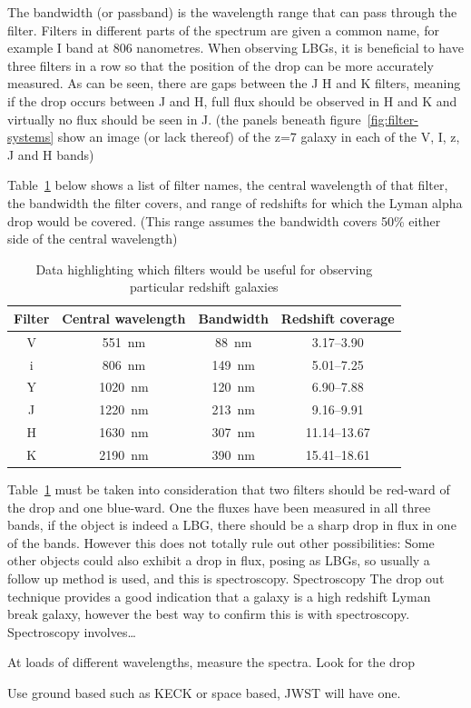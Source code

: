 		The bandwidth (or passband) is the wavelength range that can pass through the filter. Filters in different parts of the spectrum are given a common name, for example I band at 806 nanometres. When observing LBGs, it is beneficial to have three filters in a row so that the position of the drop can be more accurately measured. As can be seen, there are gaps between the J H and K filters, meaning if the drop occurs between J and H, full flux should be observed in H and K and virtually no flux should be seen in J. (the panels beneath figure~\ref{fig:filter-systems} show an image (or lack thereof) of the z=7 galaxy in each of the V, I, z, J and H bands)

		Table~\ref{tab:filter_characteristics} below shows a list of filter names, the central wavelength of that filter, the bandwidth the filter covers, and range of redshifts for which the Lyman alpha drop would be covered. (This  range assumes the bandwidth covers 50\% either side of the central wavelength)
		\begin{table}[ht]
			\begin{center}
				\begin{tabular}{c|c|c|c}
					Filter 	& Central wavelength & Bandwidth & Redshift coverage \\
					\hline \hline
					V 	& \SI{551}{\nano\meter}	 & \SI{88}{\nano\meter} & 3.17--3.90 \\
					i 	& \SI{806}{\nano\meter}	 & \SI{149}{\nano\meter} & 5.01--7.25 \\
					Y 	& \SI{1020}{\nano\meter} & \SI{120}{\nano\meter} & 6.90--7.88 \\
					J 	& \SI{1220}{\nano\meter} & \SI{213}{\nano\meter} & 9.16--9.91 \\
					H 	& \SI{1630}{\nano\meter} & \SI{307}{\nano\meter} & 11.14--13.67 \\
					K 	& \SI{2190}{\nano\meter} & \SI{390}{\nano\meter} & 15.41--18.61
				\end{tabular}
			\end{center}
			\caption{Data highlighting which filters would be useful for observing particular redshift galaxies\cite{Galactic_Astronomy_Binney_Merrifield}}
			\label{tab:filter_characteristics}
		\end{table}

		Table~\ref{tab:filter_characteristics} must be taken into consideration that two filters should be red-ward of the drop and one blue-ward. One the fluxes have been measured in all three bands, if the object is indeed a LBG, there should be a sharp drop in flux in  one of the bands. However this does not totally rule out other possibilities: Some other objects could also exhibit a drop in flux, posing as LBGs, so usually a follow up method is used, and this is spectroscopy. Spectroscopy The drop out technique provides a good indication that a galaxy is a high redshift Lyman break galaxy, however the best way to confirm this is with spectroscopy. Spectroscopy involves\ldots

		At loads of different wavelengths, measure the spectra. Look for the drop

		Use ground based such as KECK or space based, JWST will have one.


